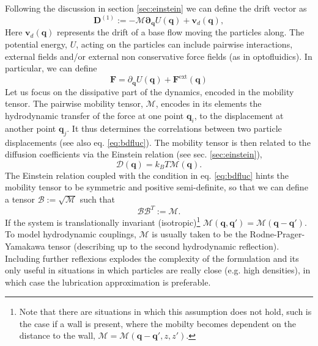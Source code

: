 \documentclass[ twoside,openright,titlepage,numbers=noenddot,%
headinclude,footinclude,cleardoublepage=empty,abstract=on,
BCOR=5mm,paper=a4,fontsize=11pt, dvipsnames
]{scrreprt}
\renewcommand{\vec}[1]{\bm{#1}}
\newcommand{\tens}[1]{\bm{\mathcal{#1}}}
\newcommand{\kT}{k_B T}
\newcommand{\ppos}{q}
\begin{document}
Following the discussion in section \ref{sec:einstein} we can define the drift vector as
\begin{equation}
  \label{eq:bddrift}
\vec{D}^{(1)} := -\tens{M}\vec{\partial}_{\vec{\ppos}}U(\vec{\ppos}) + \vec{v}_d(\vec{\ppos}),
\end{equation}
Here  $\vec{v}_d(\vec{\ppos})$ represents the drift of a base flow moving the particles along. The potential energy, $U$, acting on the particles can include pairwise interactions, external fields and/or external non conservative force fields (as in optofluidics\cite{Melendez2019}). In particular, we can define
\begin{equation}
  \vec{F} = \partial_{\vec{q}}U(\vec{q}) + \vec{F}^{\text{ext}}(\vec{q})
\end{equation}
Let us focus on the dissipative part of the dynamics, encoded in the mobility tensor. The pairwise mobility tensor, $\tens{M}$, encodes in its elements the hydrodynamic transfer of the force at one point $\vec{q}_i$, to the displacement at another point $\vec{q}_j$. It thus determines the correlations between two particle displacements (see also eq. \eqref{eq:bdfluc}).
The mobility tensor is then related to the diffusion coefficients via the Einstein relation (see sec. \ref{sec:einstein}),
\begin{equation}
  \label{eq:bdeinstein}
  \tens{D}(\vec{\ppos}) = \kT \tens{M}(\vec{\ppos}).
\end{equation}
The Einstein relation coupled with the condition in eq. \eqref{eq:bdfluc} hints the mobility tensor to be symmetric and positive semi-definite, so that we can define a tensor $\tens{B}:=\sqrt{\tens{M}}$ such that
\begin{equation}
  \tens{B}\tens{B}^T := \tens{M}.
\end{equation}
If the system is translationally invariant (isotropic)\footnote{Note that there are situations in which this assumption does not hold, such is the case if a wall is present, where the mobilty becomes dependent on the distance to the wall, $\tens{M}=\tens{M}(\vec{q}-\vec{q}', z, z')$.} $\tens{M}(\vec{\ppos}, \vec{\ppos}') = \tens{M}(\vec{\ppos}-\vec{\ppos}')$. To model hydrodynamic couplings, $\tens{M}$ is usually taken to be the Rodne-Prager-Yamakawa tensor (describing up to the second hydrodynamic reflection)\cite{Dhont1996}. Including further reflexions explodes the complexity of the formulation and its only useful in situations in which particles are really close (e.g. high densities)\cite{Dhont1996}, in which case the lubrication approximation is preferable.
\end{document}
